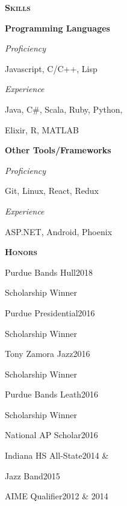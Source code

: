 \documentclass[11pt]{article}
\newcommand{\sectionfont}{\Large\scshape\bfseries\color{cg505green}}
\begin{document}
\begin{minipage}[t]{0.3\textwidth}
  {\sectionfont Skills}

  \textbf{Programming Languages}
  \begin{adjustwidth}{10pt}{}
    \emph{Proficiency}

    \quad Javascript, C/C++, Lisp

    \emph{Experience}

    \quad Java, C\#, Scala, Ruby, Python,

    \quad Elixir, R, MATLAB
  \end{adjustwidth}

  \textbf{Other Tools/Frameworks}
  \begin{adjustwidth}{10pt}{}
    \emph{Proficiency}

    \quad Git, Linux, React, Redux

    \emph{Experience}

    \quad ASP.NET, Android, Phoenix
  \end{adjustwidth}

  \vspace{5pt}

  {\sectionfont Honors}
  \begin{adjustwidth}{10pt}{}
    Purdue Bands Hull\hfill 2018

    \quad Scholarship Winner

    Purdue Presidential\hfill 2016

    \quad Scholarship Winner

    Tony Zamora Jazz\hfill 2016

    \quad Scholarship Winner

    Purdue Bands Leath\hfill 2016

    \quad Scholarship Winner

    National AP Scholar\hfill 2016



    Indiana HS All-State\hfill 2014 \&

    \quad Jazz Band\hfill 2015

    AIME Qualifier\hfill 2012 \& 2014
  \end{adjustwidth}
\end{minipage}
\hfill\vrule\hfill{}
\end{document}
